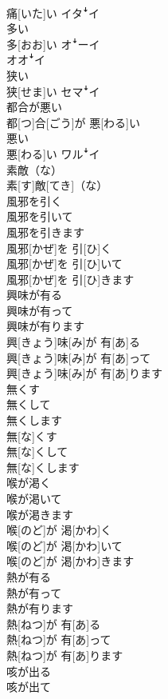 \documentclass[8pt]{extreport}
\begin{document}
\begin{CJK}{UTF8}{min}
\\	痛[いた]い	イタꜜイ
\\	多い	
\\	多[おお]い	オꜜーイ 
\\	オオꜜイ
\\	狭い	
\\	狭[せま]い	セマꜜイ
\\	都合が悪い	
\\	都[つ]合[ごう]が 悪[わる]い	
\\	悪い	
\\	悪[わる]い	ワルꜜイ
\\	素敵（な）	
\\	素[す]敵[てき]（な）	
\\	風邪を引く 
\\	風邪を引いて 
\\	風邪を引きます	
\\	風邪[かぜ]を 引[ひ]く 
\\	風邪[かぜ]を 引[ひ]いて 
\\	風邪[かぜ]を 引[ひ]きます	
\\	興味が有る 
\\	興味が有って 
\\	興味が有ります	
\\	興[きょう]味[み]が 有[あ]る 
\\	興[きょう]味[み]が 有[あ]って 
\\	興[きょう]味[み]が 有[あ]ります	
\\	無くす 
\\	無くして 
\\	無くします	
\\	無[な]くす 
\\	無[な]くして 
\\	無[な]くします	
\\	喉が渇く 
\\	喉が渇いて 
\\	喉が渇きます	
\\	喉[のど]が 渇[かわ]く 
\\	喉[のど]が 渇[かわ]いて 
\\	喉[のど]が 渇[かわ]きます	
\\	熱が有る 
\\	熱が有って 
\\	熱が有ります	
\\	熱[ねつ]が 有[あ]る 
\\	熱[ねつ]が 有[あ]って 
\\	熱[ねつ]が 有[あ]ります	
\\	咳が出る 
\\	咳が出て 

\end{CJK}
\end{document}
